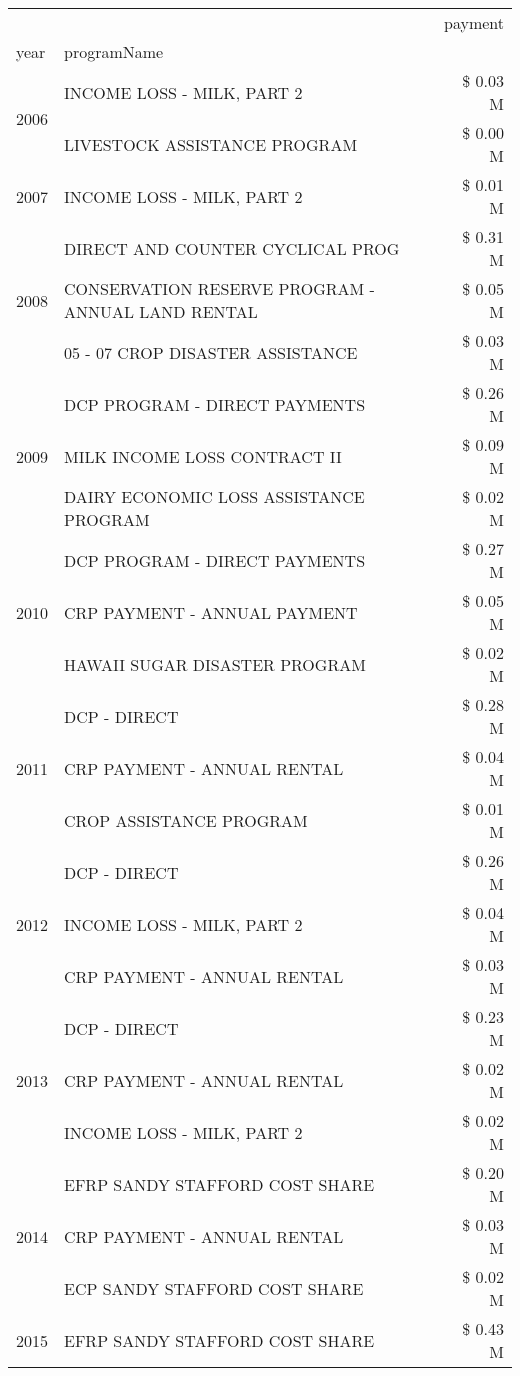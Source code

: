 \begin{tabular}{llr}
\toprule
 &  & payment \\
year & programName &  \\
\midrule
\multirow[t]{2}{*}{2006} & INCOME LOSS - MILK, PART 2 & \$ 0.03 M \\
 & LIVESTOCK ASSISTANCE PROGRAM & \$ 0.00 M \\
\cline{1-3}
2007 & INCOME LOSS - MILK, PART 2 & \$ 0.01 M \\
\cline{1-3}
\multirow[t]{3}{*}{2008} & DIRECT AND COUNTER CYCLICAL PROG & \$ 0.31 M \\
 & CONSERVATION RESERVE PROGRAM - ANNUAL LAND RENTAL & \$ 0.05 M \\
 & 05 - 07 CROP DISASTER ASSISTANCE & \$ 0.03 M \\
\cline{1-3}
\multirow[t]{3}{*}{2009} & DCP PROGRAM - DIRECT PAYMENTS & \$ 0.26 M \\
 & MILK INCOME LOSS CONTRACT II & \$ 0.09 M \\
 & DAIRY ECONOMIC LOSS ASSISTANCE PROGRAM & \$ 0.02 M \\
\cline{1-3}
\multirow[t]{3}{*}{2010} & DCP PROGRAM - DIRECT PAYMENTS & \$ 0.27 M \\
 & CRP PAYMENT - ANNUAL PAYMENT & \$ 0.05 M \\
 & HAWAII SUGAR DISASTER PROGRAM & \$ 0.02 M \\
\cline{1-3}
\multirow[t]{3}{*}{2011} & DCP - DIRECT & \$ 0.28 M \\
 & CRP PAYMENT - ANNUAL RENTAL & \$ 0.04 M \\
 & CROP ASSISTANCE PROGRAM & \$ 0.01 M \\
\cline{1-3}
\multirow[t]{3}{*}{2012} & DCP - DIRECT & \$ 0.26 M \\
 & INCOME LOSS - MILK, PART 2 & \$ 0.04 M \\
 & CRP PAYMENT - ANNUAL RENTAL & \$ 0.03 M \\
\cline{1-3}
\multirow[t]{3}{*}{2013} & DCP - DIRECT & \$ 0.23 M \\
 & CRP PAYMENT - ANNUAL RENTAL & \$ 0.02 M \\
 & INCOME LOSS - MILK, PART 2 & \$ 0.02 M \\
\cline{1-3}
\multirow[t]{3}{*}{2014} & EFRP SANDY STAFFORD COST SHARE & \$ 0.20 M \\
 & CRP PAYMENT - ANNUAL RENTAL & \$ 0.03 M \\
 & ECP SANDY STAFFORD COST SHARE & \$ 0.02 M \\
\cline{1-3}
\multirow[t]{3}{*}{2015} & EFRP SANDY STAFFORD COST SHARE & \$ 0.43 M \\

\end{tabular}
